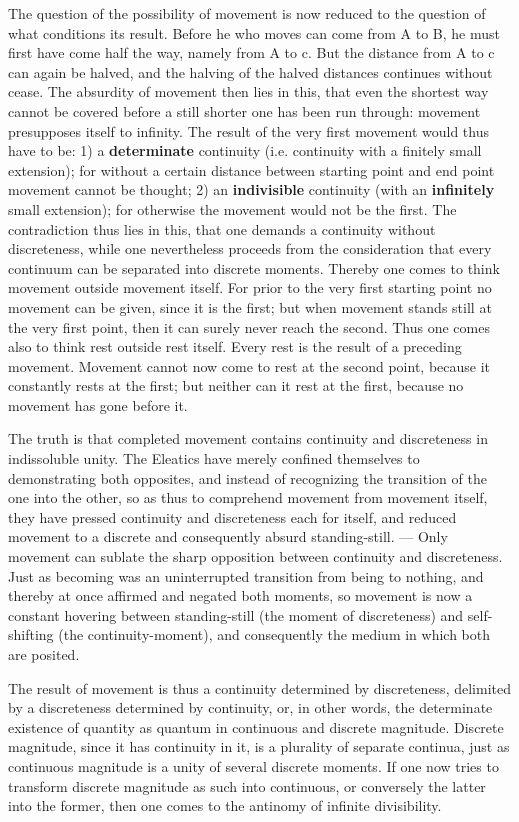 \documentclass[12pt,a4paper,openany]{book}
\newcommand{\opage}[1]{\marginnote{\footnotesize\textit{[#1]}}}
\begin{document}
The question of the possibility of movement is now reduced
to the question of what conditions its result. Before he who moves can come from
A to B, he must first have come half the way,
namely from A to c. But the distance from A to c can
again be halved, and the halving of the halved distances
continues without cease. The absurdity of movement
then lies in this, that even the shortest way cannot be covered
before a still shorter one has been run through: movement
presupposes itself to infinity. The result
of the very first movement would thus have to be: 1) a
\textbf{determinate} continuity (i.e. continuity with a finitely
small extension); for without a certain distance between
starting point and end point movement
cannot be thought; 2) an \textbf{indivisible} continuity (with an \textbf{infinitely}
small extension); for otherwise the movement
would not be the first. The contradiction thus lies
in this, that one demands a continuity without discreteness,
\setcounter{footnote}{0}%
\opage{29}while one nevertheless proceeds from the consideration that
every continuum can be separated into discrete moments.
Thereby one comes to think movement outside
movement itself. For prior to the very first starting point
no movement can be given, since
it is the first; but when movement stands still at
the very first point, then it can surely never reach the
second. Thus one comes also to think
rest outside rest itself. Every rest is the result
of a preceding movement. Movement cannot
now come to rest at the second point, because it
constantly rests at the first; but neither can it
rest at the first, because no movement has gone before it.

The truth is that completed movement contains
continuity and discreteness in indissoluble unity.
The Eleatics have merely confined themselves to demonstrating both
opposites, and instead of recognizing the transition of the one into the other, so as thus to comprehend movement
from movement itself, they have pressed continuity and
discreteness each for itself, and reduced movement to
a discrete and consequently absurd standing-still. --- Only movement can sublate the sharp opposition between
continuity and discreteness. Just as becoming was an
uninterrupted transition from being to nothing, and thereby
at once affirmed and negated both moments, so movement is now a constant hovering
between standing-still (the moment of discreteness) and self-shifting (the continuity-moment), and consequently the medium
in which both are posited.

The result of movement is thus a continuity determined by
discreteness, delimited by a discreteness determined by
continuity, or, in other words, the determinate existence of quantity as quantum in continuous
\setcounter{footnote}{0}%
\opage{30}and discrete magnitude. Discrete magnitude, since
it has continuity in it, is a plurality of separate continua, just as continuous magnitude is a unity of
several discrete moments. If one now tries to transform
discrete magnitude as such into continuous,
or conversely the latter into the former, then one comes to
the antinomy of infinite divisibility.
\end{document}
